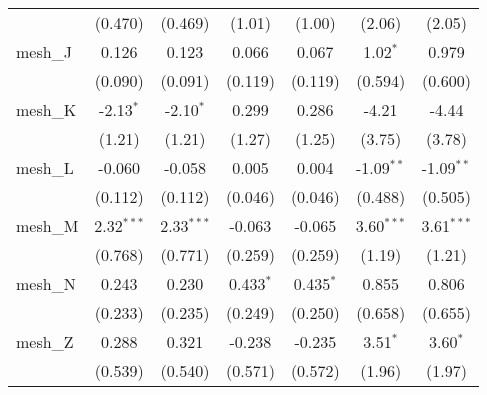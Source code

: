 \begin{tabular}{lcccccc}
                                                               & (0.470)       & (0.469)        & (1.01)        & (1.00)         & (2.06)        & (2.05)\\   
   mesh\_J                                                     & 0.126         & 0.123          & 0.066         & 0.067          & 1.02$^{*}$    & 0.979\\   
                                                               & (0.090)       & (0.091)        & (0.119)       & (0.119)        & (0.594)       & (0.600)\\   
   mesh\_K                                                     & -2.13$^{*}$   & -2.10$^{*}$    & 0.299         & 0.286          & -4.21         & -4.44\\   
                                                               & (1.21)        & (1.21)         & (1.27)        & (1.25)         & (3.75)        & (3.78)\\   
   mesh\_L                                                     & -0.060        & -0.058         & 0.005         & 0.004          & -1.09$^{**}$  & -1.09$^{**}$\\   
                                                               & (0.112)       & (0.112)        & (0.046)       & (0.046)        & (0.488)       & (0.505)\\   
   mesh\_M                                                     & 2.32$^{***}$  & 2.33$^{***}$   & -0.063        & -0.065         & 3.60$^{***}$  & 3.61$^{***}$\\   
                                                               & (0.768)       & (0.771)        & (0.259)       & (0.259)        & (1.19)        & (1.21)\\   
   mesh\_N                                                     & 0.243         & 0.230          & 0.433$^{*}$   & 0.435$^{*}$    & 0.855         & 0.806\\   
                                                               & (0.233)       & (0.235)        & (0.249)       & (0.250)        & (0.658)       & (0.655)\\   
   mesh\_Z                                                     & 0.288         & 0.321          & -0.238        & -0.235         & 3.51$^{*}$    & 3.60$^{*}$\\   
                                                               & (0.539)       & (0.540)        & (0.571)       & (0.572)        & (1.96)        & (1.97)\\   

\end{tabular}
